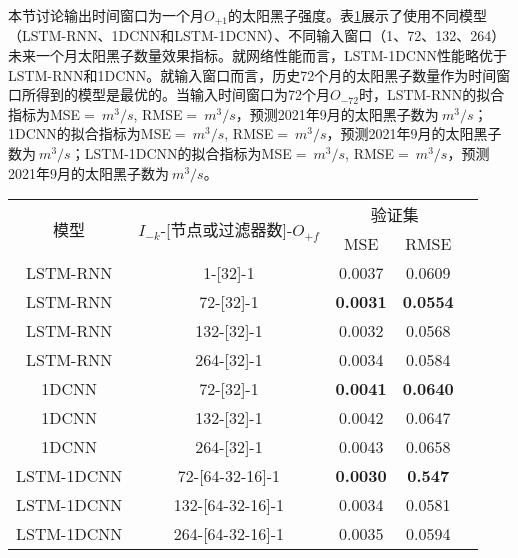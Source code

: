 本节讨论输出时间窗口为一个月$O_{+1}$的太阳黑子强度。表\ref{tab:ss_number_out_1}展示了使用不同模型（LSTM-RNN、1DCNN和LSTM-1DCNN）、不同输入窗口（1、72、132、264）未来一个月太阳黑子数量效果指标。就网络性能而言，LSTM-1DCNN性能略优于LSTM-RNN和1DCNN。就输入窗口而言，历史72个月的太阳黑子数量作为时间窗口所得到的模型是最优的。当输入时间窗口为72个月$O_{-72}$时，LSTM-RNN的拟合指标为MSE$=\SI{}{m^{3}/s}$, RMSE$=\SI{}{m^{3}/s}$，预测2021年9月的太阳黑子数为$\SI{}{m^{3}/s}$；1DCNN的拟合指标为MSE$=\SI{}{m^{3}/s}$, RMSE$=\SI{}{m^{3}/s}$，预测2021年9月的太阳黑子数为$\SI{}{m^{3}/s}$；LSTM-1DCNN的拟合指标为MSE$=\SI{}{m^{3}/s}$, RMSE$=\SI{}{m^{3}/s}$，预测2021年9月的太阳黑子数为$\SI{}{m^{3}/s}$。

\begin{table}[!htbp]
    \centering
    \label{tab:ss_number_out_1}
    \footnotesize
    \renewcommand{\arraystretch}{1}
    \begin{tabular}{ccccc}
      \toprule
      \multirow{2}{*}{模型} & \multirow{2}{*}{$I_{-k}$-[节点或过滤器数]-$O_{+f}$} & \multicolumn{2}{c}{验证集}\\
      \cmidrule(lr){3-4}
      \noalign{\smallskip}
      & & MSE & RMSE\\
      \midrule 
      LSTM-RNN & 1-[32]-1 & 0.0037 & 0.0609 \\
      LSTM-RNN & 72-[32]-1 & \textbf{0.0031} & \textbf{0.0554} \\
      LSTM-RNN & 132-[32]-1 & 0.0032 & 0.0568 \\
      LSTM-RNN & 264-[32]-1 & 0.0034 & 0.0584 \\
      \hline
      1DCNN & 72-[32]-1 & \textbf{0.0041} & \textbf{0.0640} \\
      1DCNN & 132-[32]-1 & 0.0042 & 0.0647 \\
      1DCNN & 264-[32]-1 & 0.0043 & 0.0658 \\
      \hline
      LSTM-1DCNN & 72-[64-32-16]-1 & \textbf{0.0030} & \textbf{0.547} \\
      LSTM-1DCNN & 132-[64-32-16]-1 & 0.0034 & 0.0581 \\
      LSTM-1DCNN & 264-[64-32-16]-1 & 0.0035 & 0.0594 \\
      \bottomrule
    \end{tabular}
  \end{table}


